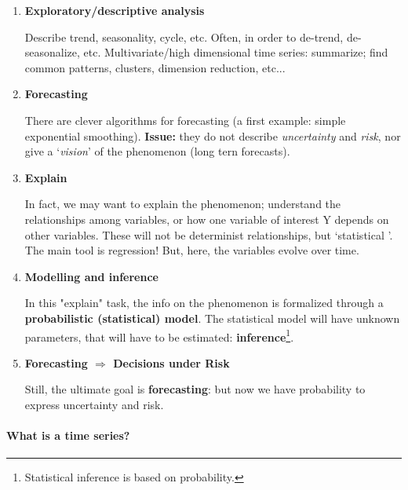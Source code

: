 \documentclass[dvipsnames,12pt]{book}
\begin{document}
                \begin{enumerate}
                    \item \textbf{Exploratory/descriptive analysis}
    
                        Describe trend, seasonality, cycle, etc. 
                        Often, in order to de-trend, de-seasonalize, etc.
                        Multivariate/high dimensional time series: summarize; find common patterns, clusters, dimension reduction, etc...
                        
                    \item \textbf{Forecasting}
    
                        There are clever algorithms for forecasting (a first example: simple exponential smoothing).
                        \textbf{Issue:} they do not describe \textit{uncertainty} and \textit{risk}, nor give a ‘\textit{vision}’ of the phenomenon (long tern forecasts).
                    
                    \item \textbf{Explain}
    
                        In fact, we may want to explain the phenomenon; understand the relationships among variables, or how one variable of interest Y depends on other variables. These will not be determinist relationships, but ‘statistical ’. The main tool is regression! But, here, the variables evolve over time.
    
                    \item \textbf{Modelling and inference}
    
                        In this "explain" task, the info on the phenomenon is formalized through a \textbf{probabilistic (statistical) model}. The statistical model will have unknown parameters, that will have to be estimated: \textbf{inference}\footnote{Statistical inference is based on probability.}.
    
                    \item \textbf{Forecasting \(\Rightarrow\) Decisions under Risk}
    
                        Still, the ultimate goal is \textbf{forecasting}: but now we have probability to express uncertainty and risk.
                        
                \end{enumerate}
    
                \paragraph{What is a time series?}
    
\end{document}
